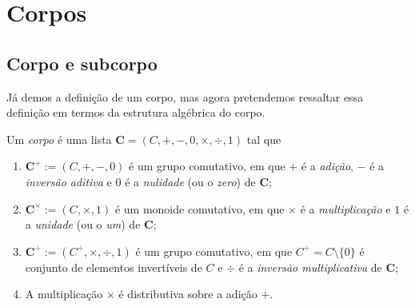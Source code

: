 \section{Corpos}

\subsection{Corpo e subcorpo}

Já demos a definição de um corpo, mas agora pretendemos ressaltar essa definição em termos da estrutura algébrica do corpo.



\begin{definition}
Um \emph{corpo} é uma lista $\bm C = (C,+,-,0,\times,\div,1)$ tal que
	\begin{enumerate}
	\item $\bm C^+ := (C,+,-,0)$ é um grupo comutativo, em que $+$ é a \emph{adição}, $-$ é a \emph{inversão aditiva} e $0$ é a \emph{nulidade} (ou o \emph{zero}) de $\bm C$;
	\item $\bm C^\times := (C,\times,1)$ é um monoide comutativo, em que $\times$ é a \emph{multiplicação} e $1$ é a \emph{unidade} (ou o \emph{um}) de $\bm C$;
	\item $\bm C^{\div} := (C^{\div},\times,\div,1)$ é um grupo comutativo, em que $C^{\div} = C \setminus \{0\}$ é  conjunto de elementos invertíveis de $C$ e $\div$ é a \emph{inversão multiplicativa} de $\bm C$;
	\item A multiplicação $\times$ é distributiva sobre a adição $+$.
	\end{enumerate}
\end{definition}

